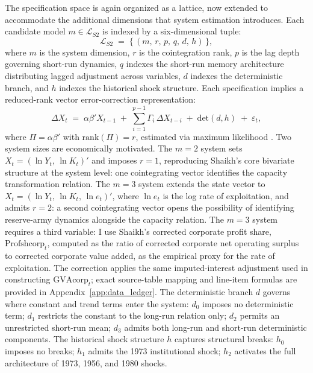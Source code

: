 \documentclass[11pt,a4paper]{article}
\begin{document}
The specification space is again organized as a lattice, now extended to
accommodate the additional dimensions that system estimation introduces. Each
candidate model $m \in \mathcal{L}_{S2}$ is indexed by a six-dimensional
tuple:
%
\begin{equation}
	\label{eq:S2_lattice}
	\mathcal{L}_{S2} \;=\;
	\bigl\{\,(m,\, r,\, p,\, q,\, d,\, h)\,\bigr\},
\end{equation}
%
where $m$ is the system dimension, $r$ is the cointegration rank, $p$ is the
lag depth governing short-run dynamics, $q$ indexes the short-run memory
architecture distributing lagged adjustment across variables, $d$ indexes the
deterministic branch, and $h$ indexes the historical shock structure. Each
specification implies a reduced-rank vector error-correction representation:
%
\begin{equation}
	\label{eq:S2_vecm}
	\Delta X_t \;=\; \alpha\beta' X_{t-1}
	\;+\; \sum_{i=1}^{p-1} \Gamma_i \,\Delta X_{t-i}
	\;+\; \text{det}(d,h)
	\;+\; \varepsilon_t,
\end{equation}
%
where $\Pi = \alpha\beta'$ with $\mathrm{rank}(\Pi) = r$, estimated via
maximum likelihood \citep{Stigler2020}. Two system
sizes are economically motivated. The $m = 2$ system sets
$X_t = (\ln Y_t,\, \ln K_t)'$ and imposes $r = 1$, reproducing Shaikh's
core bivariate structure at the system level: one cointegrating vector
identifies the capacity transformation relation. The $m = 3$ system extends
the state vector to $X_t = (\ln Y_t,\, \ln K_t,\, \ln e_t)'$, where
$\ln e_t$ is the log rate of exploitation, and admits $r = 2$: a second
cointegrating vector opens the possibility of identifying reserve-army
dynamics alongside the capacity relation. The $m = 3$ system requires a
third variable: I use Shaikh's corrected corporate profit share,
$\text{Profshcorp}_t$, computed as the ratio of corrected corporate net
operating surplus to corrected corporate value added, as the empirical proxy
for the rate of exploitation. The correction applies the same
imputed-interest adjustment used in constructing $\text{GVAcorp}_t$; exact
source-table mapping and line-item formulas are provided in
Appendix~\ref{app:data_ledger}. The deterministic branch $d$ governs where
constant and trend terms enter the system: $d_0$ imposes no deterministic
term; $d_1$ restricts the constant to the long-run relation only; $d_2$
permits an unrestricted short-run mean; $d_3$ admits both long-run and
short-run deterministic components. The historical shock structure $h$
captures structural breaks: $h_0$ imposes no breaks; $h_1$ admits the 1973
institutional shock; $h_2$ activates the full architecture of 1973, 1956,
and 1980 shocks.
\end{document}
